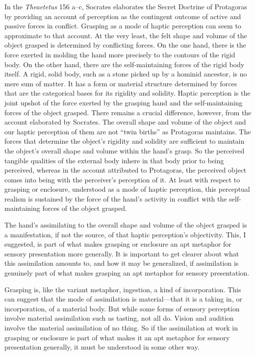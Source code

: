 \documentclass[12pt]{article}
\begin{document}
In the \emph{Theaetetus} 156 a--c, Socrates elaborates the Secret Doctrine of Protagoras by providing an account of perception as the contingent outcome of active and passive forces in conflict. Grasping as a mode of haptic perception can seem to approximate to that account. At the very least, the felt shape and volume of the object grasped is determined by conflicting forces. On the one hand, there is the force exerted in molding the hand more precisely to the contours of the rigid body. On the other hand, there are the self-maintaining forces of the rigid body itself. A rigid, solid body, such as a stone picked up by a hominid ancestor, is no mere sum of matter. It has a form or material structure determined by forces that are the categorical bases for its rigidity and solidity. Haptic perception is the joint upshot of the force exerted by the grasping hand and the self-maintaining forces of the object grasped. There remains a crucial difference, however, from the account elaborated by Socrates. The overall shape and volume of the object and our haptic perception of them are not ``twin births'' as Protagoras maintains. The forces that determine the object's rigidity and solidity are sufficient to maintain the object's overall shape and volume within the hand's grasp. So the perceived tangible qualities of the external body inhere in that body prior to being perceived, whereas in the account attributed to Protagoras, the perceived object comes into being with the perceiver's perception of it. At least with respect to grasping or enclosure, understood as a mode of haptic perception, this perceptual realism is sustained by the force of the hand's activity in conflict with the self-maintaining forces of the object grasped. 

The hand's assimilating to the overall shape and volume of the object grasped is a manifestation, if not the source, of that haptic perception's objectivity. This, I suggested, is part of what makes grasping or enclosure an apt metaphor for sensory presentation more generally. It is important to get clearer about what this assimilation amounts to, and how it may be generalized, if assimilation is genuinely part of what makes grasping an apt metaphor for sensory presentation.

Grasping is, like the variant meta\-phor, ingestion, a kind of incorporation. This can suggest that the mode of assimilation is material---that it is a taking in, or incorporation, of a material body. But while some forms of sensory perception involve material assimilation such as tasting, not all do. Vision and audition involve the material assimilation of no thing. So if the assimilation at work in grasping or enclosure is part of what makes it an apt metaphor for sensory presentation generally, it must be understood in some other way.
\end{document}
